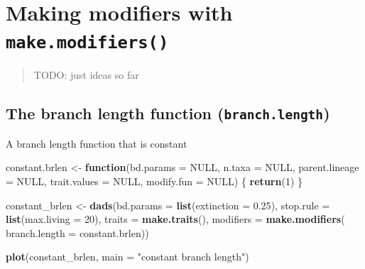 \documentclass[]{book}
\newenvironment{Shaded}{\begin{snugshade}}{\end{snugshade}}
\newcommand{\ControlFlowTok}[1]{\textcolor[rgb]{0.13,0.29,0.53}{\textbf{#1}}}
\newcommand{\DataTypeTok}[1]{\textcolor[rgb]{0.13,0.29,0.53}{#1}}
\newcommand{\DecValTok}[1]{\textcolor[rgb]{0.00,0.00,0.81}{#1}}
\newcommand{\FloatTok}[1]{\textcolor[rgb]{0.00,0.00,0.81}{#1}}
\newcommand{\KeywordTok}[1]{\textcolor[rgb]{0.13,0.29,0.53}{\textbf{#1}}}
\newcommand{\NormalTok}[1]{#1}
\newcommand{\OtherTok}[1]{\textcolor[rgb]{0.56,0.35,0.01}{#1}}
\newcommand{\StringTok}[1]{\textcolor[rgb]{0.31,0.60,0.02}{#1}}
\begin{document}
\hypertarget{makemodifiers}{%
\chapter{\texorpdfstring{Making modifiers with \texttt{make.modifiers()}}{Making modifiers with make.modifiers()}}\label{makemodifiers}}

\begin{quote}
TODO: just ideas so far
\end{quote}

\hypertarget{the-branch-length-function-branch.length}{%
\section{\texorpdfstring{The branch length function (\texttt{branch.length})}{The branch length function (branch.length)}}\label{the-branch-length-function-branch.length}}

A branch length function that is constant

\begin{Shaded}
\begin{Highlighting}[]
\NormalTok{constant.brlen <-}\StringTok{ }\ControlFlowTok{function}\NormalTok{(}\DataTypeTok{bd.params =} \OtherTok{NULL}\NormalTok{,}
                         \DataTypeTok{n.taxa =} \OtherTok{NULL}\NormalTok{,}
                         \DataTypeTok{parent.lineage =} \OtherTok{NULL}\NormalTok{,}
                         \DataTypeTok{trait.values =} \OtherTok{NULL}\NormalTok{,}
                         \DataTypeTok{modify.fun =} \OtherTok{NULL}\NormalTok{) \{}
    \KeywordTok{return}\NormalTok{(}\DecValTok{1}\NormalTok{)}
\NormalTok{\}}

\NormalTok{constant_brlen <-}\StringTok{ }\KeywordTok{dads}\NormalTok{(}\DataTypeTok{bd.params =} \KeywordTok{list}\NormalTok{(}\DataTypeTok{extinction =} \FloatTok{0.25}\NormalTok{),}
                     \DataTypeTok{stop.rule =} \KeywordTok{list}\NormalTok{(}\DataTypeTok{max.living =} \DecValTok{20}\NormalTok{),}
                     \DataTypeTok{traits    =} \KeywordTok{make.traits}\NormalTok{(),}
                     \DataTypeTok{modifiers =} \KeywordTok{make.modifiers}\NormalTok{(}
                        \DataTypeTok{branch.length =}\NormalTok{ constant.brlen))}

\KeywordTok{plot}\NormalTok{(constant_brlen, }\DataTypeTok{main =} \StringTok{"constant branch length"}\NormalTok{)}
\end{Highlighting}
\end{Shaded}
\end{document}
